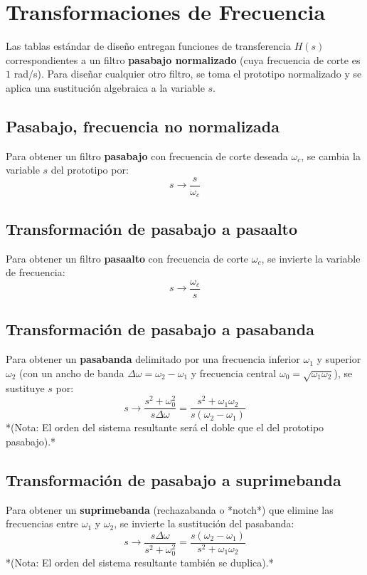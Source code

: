 \section{Transformaciones de Frecuencia}

Las tablas estándar de diseño entregan funciones de transferencia $H(s)$ correspondientes a un filtro \textbf{pasabajo normalizado} (cuya frecuencia de corte es $1$ rad/s). Para diseñar cualquier otro filtro, se toma el prototipo normalizado y se aplica una sustitución algebraica a la variable $s$.

\subsection{Pasabajo, frecuencia no normalizada}

Para obtener un filtro \textbf{pasabajo} con frecuencia de corte deseada $\omega_c$, se cambia la variable $s$ del prototipo por:
\begin{equation}
	s \longrightarrow \frac{s}{\omega_c}
\end{equation}

\subsection{Transformaci\'{o}n de pasabajo a pasaalto}

Para obtener un filtro \textbf{pasaalto} con frecuencia de corte $\omega_c$, se invierte la variable de frecuencia:
\begin{equation}
	s \longrightarrow \frac{\omega_c}{s}
\end{equation}

\subsection{Transformaci\'{o}n de pasabajo a pasabanda}

Para obtener un \textbf{pasabanda} delimitado por una frecuencia inferior $\omega_1$ y superior $\omega_2$ (con un ancho de banda $\Delta\omega = \omega_2 - \omega_1$ y frecuencia central $\omega_0 = \sqrt{\omega_1 \omega_2}$), se sustituye $s$ por:
\begin{equation}
	s \longrightarrow \frac{s^2 + \omega_0^2}{s \Delta\omega} = \frac{s^2 + \omega_1 \omega_2}{s (\omega_2 - \omega_1)}
\end{equation}
*(Nota: El orden del sistema resultante será el doble que el del prototipo pasabajo).*

\subsection{Transformaci\'{o}n de pasabajo a suprimebanda}

Para obtener un \textbf{suprimebanda} (rechazabanda o *notch*) que elimine las frecuencias entre $\omega_1$ y $\omega_2$, se invierte la sustitución del pasabanda:
\begin{equation}
	s \longrightarrow \frac{s \Delta\omega}{s^2 + \omega_0^2} = \frac{s (\omega_2 - \omega_1)}{s^2 + \omega_1 \omega_2}
\end{equation}
*(Nota: El orden del sistema resultante también se duplica).*

